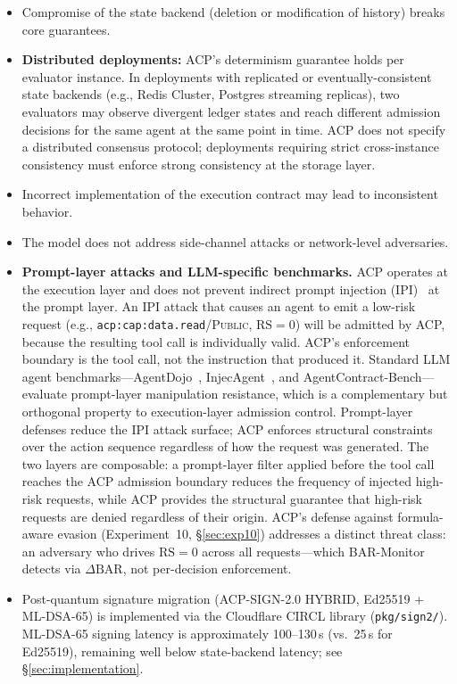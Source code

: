 \documentclass[11pt]{article}
\theoremstyle{definition}
\begin{document}
\begin{itemize}[noitemsep]
  \item Compromise of the state backend (deletion or modification of history) breaks core guarantees.
  \item \textbf{Distributed deployments:} ACP's determinism guarantee holds per evaluator instance.
        In deployments with replicated or eventually-consistent state backends (e.g., Redis Cluster,
        Postgres streaming replicas), two evaluators may observe divergent ledger states and reach
        different admission decisions for the same agent at the same point in time.
        ACP does not specify a distributed consensus protocol; deployments requiring strict
        cross-instance consistency must enforce strong consistency at the storage layer.
  \item Incorrect implementation of the execution contract may lead to inconsistent behavior.
  \item The model does not address side-channel attacks or network-level adversaries.
  \item \textbf{Prompt-layer attacks and LLM-specific benchmarks.}
        ACP operates at the execution layer and does not prevent indirect prompt injection
        (IPI)~\cite{greshake2023not} at the prompt layer.
        An IPI attack that causes an agent to emit a low-risk request
        (e.g., \texttt{acp:cap:data.read}/\textsc{Public}, $\mathrm{RS}=0$) will be
        admitted by ACP, because the resulting tool call is individually valid.
        ACP's enforcement boundary is the tool call, not the instruction that produced it.
        Standard LLM agent benchmarks---AgentDojo~\cite{debenedetti2024agentdojo},
        InjecAgent~\cite{zhan2024injecagent}, and AgentContract-Bench---evaluate
        prompt-layer manipulation resistance, which is a complementary but orthogonal
        property to execution-layer admission control.
        Prompt-layer defenses reduce the IPI attack surface; ACP enforces structural
        constraints over the action sequence regardless of how the request was generated.
        The two layers are composable: a prompt-layer filter applied before the tool call
        reaches the ACP admission boundary reduces the frequency of injected high-risk
        requests, while ACP provides the structural guarantee that high-risk requests
        are denied regardless of their origin.
        ACP's defense against formula-aware evasion (Experiment~10, \S\ref{sec:exp10})
        addresses a distinct threat class: an adversary who drives
        $\mathrm{RS}=0$ across all requests---which BAR-Monitor detects via
        $\Delta\mathrm{BAR}$, not per-decision enforcement.
  \item Post-quantum signature migration (ACP-SIGN-2.0 HYBRID, Ed25519 + ML-DSA-65)
    is implemented via the Cloudflare CIRCL library (\texttt{pkg/sign2/}).
    ML-DSA-65 signing latency is approximately 100--130\,\textmu s (vs.\ 25\,\textmu s for Ed25519),
    remaining well below state-backend latency; see \S\ref{sec:implementation}.
\end{itemize}
\end{document}
